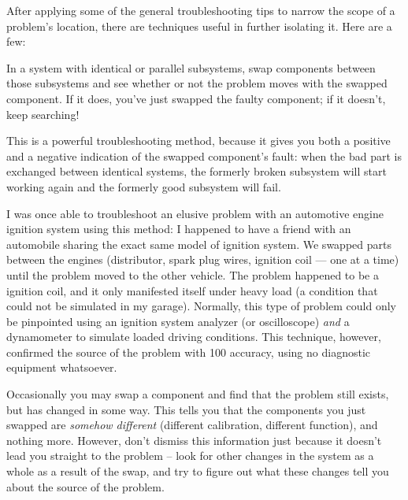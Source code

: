 \stopsubsection

\stopsection

\startsection[title={Specific Troubleshooting
Techniques},reference={sec:xtocid15790977}]

After applying some of the general troubleshooting tips to narrow the
scope of a problem's location, there are techniques useful in further
isolating it. Here are a few:

\startsubsection[title={Swap Identical
Components},reference={sec:xtocid15790978}]

In a system with identical or parallel subsystems, swap components
between those subsystems and see whether or not the problem moves with
the swapped component. If it does, you've just swapped the faulty
component; if it doesn't, keep searching!

This is a powerful troubleshooting method, because it gives you both a
positive and a negative indication of the swapped component's fault:
when the bad part is exchanged between identical systems, the formerly
broken subsystem will start working again and the formerly good
subsystem will fail.

I was once able to troubleshoot an elusive problem with an automotive
engine ignition system using this method: I happened to have a friend
with an automobile sharing the exact same model of ignition system. We
swapped parts between the engines (distributor, spark plug wires,
ignition coil --- one at a time) until the problem moved to the other
vehicle. The problem happened to be a  ignition coil,
and it only manifested itself under heavy load (a condition that could
not be simulated in my garage). Normally, this type of problem could
only be pinpointed using an ignition system analyzer (or oscilloscope)
{\em and} a dynamometer to simulate loaded driving conditions. This
technique, however, confirmed the source of the problem with
100 accuracy, using no diagnostic equipment whatsoever.

Occasionally you may swap a component and find that the problem still
exists, but has changed in some way. This tells you that the components
you just swapped are {\em somehow different} (different calibration,
different function), and nothing more. However, don't dismiss this
information just because it doesn't lead you straight to the problem --
look for other changes in the system as a whole as a result of the swap,
and try to figure out what these changes tell you about the source of
the problem.

